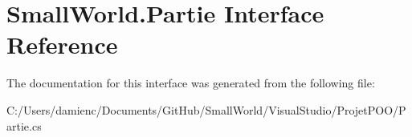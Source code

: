 \hypertarget{interface_small_world_1_1_partie}{\section{Small\-World.\-Partie Interface Reference}
\label{interface_small_world_1_1_partie}
}


The documentation for this interface was generated from the following file\-:\begin{DoxyCompactItemize}
\item 
C\-:/\-Users/damienc/\-Documents/\-Git\-Hub/\-Small\-World/\-Visual\-Studio/\-Projet\-P\-O\-O/Partie.\-cs\end{DoxyCompactItemize}
